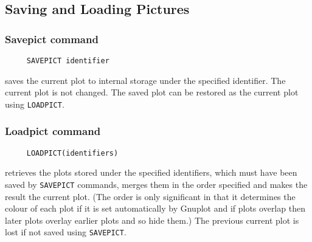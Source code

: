\subsection{Saving and Loading Pictures}

\subsubsection*{Savepict command}
\begin{verbatim}
     SAVEPICT identifier
\end{verbatim}
\label{logoturtle:savepict}
saves the current plot to internal storage under the specified
identifier.  The current plot is not changed.  The saved plot can be
restored as the current plot using \texttt{LOADPICT}.

\subsubsection*{Loadpict command}
\begin{verbatim}
     LOADPICT(identifiers)
\end{verbatim}
retrieves the plots stored under the specified identifiers, which must
have been saved by \texttt{SAVEPICT} commands, merges them in the
order specified and makes the result the current plot.  (The order is
only significant in that it determines the colour of each plot if it
is set automatically by Gnuplot and if plots overlap then later plots
overlay earlier plots and so hide them.)  The previous current plot is
lost if not saved using \texttt{SAVEPICT}.
